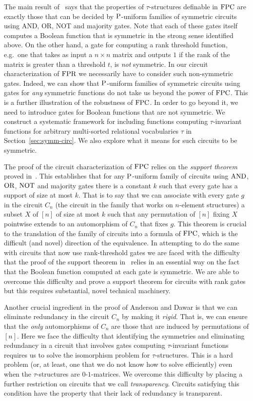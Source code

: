 \documentclass[a4paper,UKenglish]{lipics-v2018}
\begin{document}
The main result of~\cite{AndersonD17} says that the properties of
$\tau$-structures definable in $\text{\upshape FPC}$ are exactly those that can be decided by
$\mathrm{P}$-uniform families of symmetric circuits using AND, OR, NOT and majority
gates. Note that each of these gates itself computes a Boolean function that is
symmetric in the strong sense identified above. On the other hand, a gate for
computing a rank threshold function, e.g.\ one that takes as input a $n \times
n$ matrix and outputs $1$ if the rank of the matrix is greater than a threshold
$t$, is \emph{not} symmetric. In our circuit characterization of $\text{\upshape FPR}$ we
necessarily have to consider such non-symmetric gates. Indeed, we can show that
$\mathrm{P}$-uniform families of symmetric circuits using gates for \emph{any}
symmetric functions do not take us beyond the power of $\text{\upshape FPC}$. This is a further
illustration of the robustness of $\text{\upshape FPC}$. In order to go beyond it, we need to
introduce gates for Boolean functions that are not symmetric. We construct a
systematic framework for including functions computing $\tau$-invariant
functions for arbitrary multi-sorted relational vocabularies $\tau$ in
Section~\ref{sec:symm-circ}. We also explore what it means for such circuits to
be symmetric.

The proof of the circuit characterization of $\text{\upshape FPC}$ relies on the \emph{support
  theorem} proved in~\cite{AndersonD17}. This establishes that for any
$\mathrm{P}$-uniform family of circuits using $\text{\upshape AND}$, $\text{\upshape OR}$, $\text{\upshape NOT}$ and majority gates
there is a constant $k$ such that every gate has a support of size at most $k$.
That is to say that we can associate with every gate $g$ in the circuit $C_n$
(the circuit in the family that works on $n$-element structures) a subset $X$ of
$[n]$ of size at most $k$ such that any permutation of $[n]$ fixing $X$
pointwise extends to an automorphism of $C_n$ that fixes $g$. This theorem is
crucial to the translation of the family of circuits into a formula of $\text{\upshape FPC}$,
which is the difficult (and novel) direction of the equivalence. In attempting
to do the same with circuits that now use rank-threshold gates we are faced with
the difficulty that the proof of the support theorem in~\cite{AndersonD17}
relies in an essential way on the fact that the Boolean function computed at
each gate is symmetric. We are able to overcome this difficulty and prove a
support theorem for circuits with rank gates but this requires substantial,
novel technical machinery.

Another crucial ingredient in the proof of Anderson and Dawar is that we can
eliminate redundancy in the circuit $C_n$ by making it \emph{rigid}. That is, we
can ensure that the \emph{only} automorphisms of $C_n$ are those that are
induced by permutations of $[n]$. Here we face the difficulty that identifying
the symmetries and eliminating redundancy in a circuit that involves gates
computing $\tau$-invariant functions requires us to solve the isomorphism
problem for $\tau$-structures. This is a hard problem (or, at least, one that we
do not know how to solve efficiently) even when the $\tau$-structures are
$0$-$1$-matrices. We overcome this difficulty by placing a further restriction
on circuits that we call \emph{transparency}. Circuits satisfying this condition
have the property that their lack of redundancy is transparent.
\end{document}
